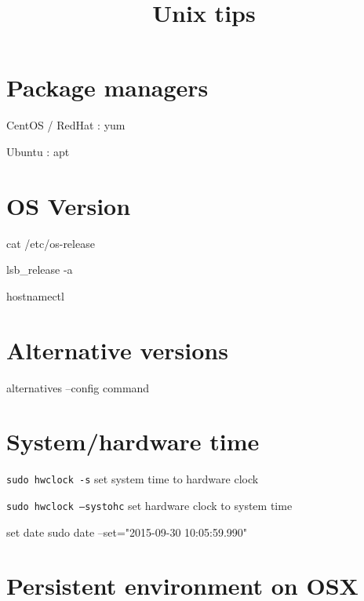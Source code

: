 


\title{Unix tips}


\date{}


\maketitle

\justify

\renewcommand{\abstractname}{}

\begin{abstract}

\end{abstract}


\section*{Package managers}

CentOS / RedHat : yum

Ubuntu : apt


\section*{OS Version}

cat /etc/os-release

lsb_release -a

hostnamectl


\section*{Alternative versions}

alternatives --config command



\section*{System/hardware time}

\texttt{sudo hwclock -s} set system time to hardware clock

\texttt{sudo hwclock --systohc} set hardware clock to system time

set date sudo date --set="2015-09-30 10:05:59.990"

\section*{Persistent environment on OSX}


